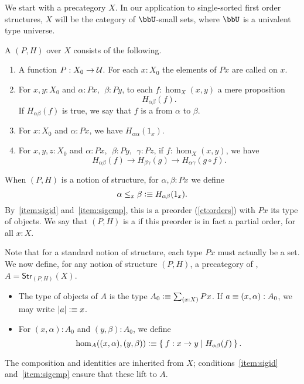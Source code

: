 We start with a precategory $X$.  In our application to
single-sorted first order structures, $X$ will be the category %
of $\bbU$-small sets, where $\bbU$ is a univalent type universe.

\begin{defn}\label{ct:sig}
  A  $(P,H)$ over $X$ consists of the following.
  \begin{enumerate}
  \item A function $P:X_0 \to \mathcal{U}$.
    For each $x:X_0$ the elements of $Px$ are called  on $x$.
  \item For $x,y:X_0$ and $\alpha:Px$, $\;\beta:Py$, to each $f:\hom_X(x,y)$ a mere proposition 
  \[ H_{\alpha\beta}(f).\]
    If $H_{\alpha\beta}(f)$ is true, we say that $f$ is a  from $\alpha$ to $\beta$.
  \item For $x:X_0$ and $\alpha:Px$, we have $H_{\alpha\alpha}(1_x)$.\label{item:sigid}
  \item For $x,y,z:X_0$ and $\alpha:Px$, $\;\beta:Py$, $\;\gamma:Pz$, 
if $f:\hom_X(x,y)$, we have 
  \[ H_{\alpha\beta}(f)\to H_{\beta\gamma}(g)\to H_{\alpha\gamma}(g\circ   f).\]\label{item:sigcmp}  
   \end{enumerate}
  When $(P,H)$ is a notion of structure, for $\alpha,\beta:Px$ we define
  \[ \alpha\leq_x\beta \vcentcolon\equiv H_{\alpha\beta}(1_x).\]
  By~\ref{item:sigid} and~\ref{item:sigcmp}, this is a preorder (\autoref{ct:orders}) with $Px$ its type of objects.
  We say that $(P,H)$ is a  if this preorder is in fact a partial order, for all $x:X$.
\end{defn}

Note that for a standard notion of structure, each type $Px$ must actually be a set.
We now define, for any notion of structure $(P,H)$, a precategory of , $A = \mathsf{Str}_{(P,H)}(X)$.
\begin{itemize}
\item The type of objects of $A$ is the type $A_0 \defeq \sm{x:X} Px$.
  If $a\equiv (x,\alpha):A_0$, we may write $|a| \vcentcolon\equiv x$.
\item For $(x,\alpha):A_0$ and $(y,\beta):A_0$, we define
  \[\hom_A((x,\alpha),(y,\beta)) \vcentcolon\equiv \Set{ f:x \to y | H_{\alpha\beta}(f)}.\]
\end{itemize}
The composition and identities are inherited from $X$; conditions~\ref{item:sigid} and~\ref{item:sigcmp} ensure that these lift to $A$.

